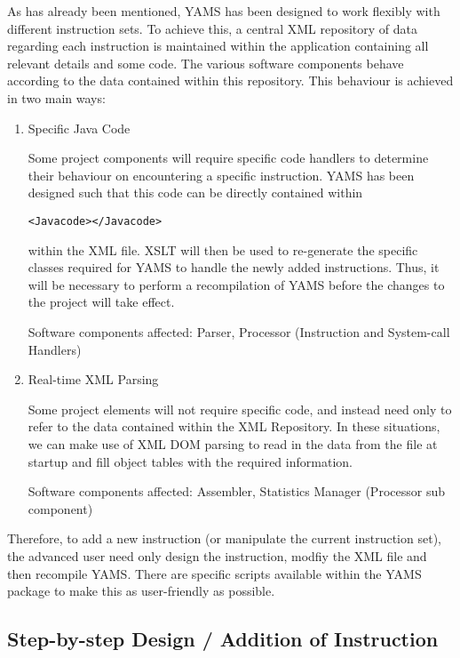 \documentclass[12pt]{report}
\begin{document}
As has already been mentioned, YAMS has been designed to work flexibly with different instruction sets. To achieve this, a central XML repository of data regarding each instruction is maintained within the application containing all relevant details and some code. The various software components behave according to the data contained within this repository. This behaviour is achieved in two main ways:

\begin{enumerate}

\item Specific Java Code

Some project components will require specific code handlers to determine their behaviour on encountering a specific instruction. YAMS has been designed such that this code can be directly contained within \begin{verbatim}<Javacode></Javacode>\end{verbatim} within the XML file. XSLT will then be used to re-generate the specific classes required for YAMS to handle the newly added instructions. Thus, it will be necessary to perform a recompilation of YAMS before the changes to the project will take effect.

Software components affected: Parser, Processor (Instruction and System-call Handlers)


\item Real-time XML Parsing

Some project elements will not require specific code, and instead need only to refer to the data contained within the XML Repository. In these situations, we can make use of XML DOM parsing to read in the data from the file at startup and fill object tables with the required information.

Software components affected:	Assembler, Statistics Manager (Processor sub component)

\end{enumerate}


Therefore, to add a new instruction (or manipulate the current instruction set), the advanced user need only design the instruction, modfiy the XML file and then recompile YAMS. There are specific scripts available within the YAMS package to make this as user-friendly as possible.

\subsection{Step-by-step Design / Addition of Instruction}
\end{document}
